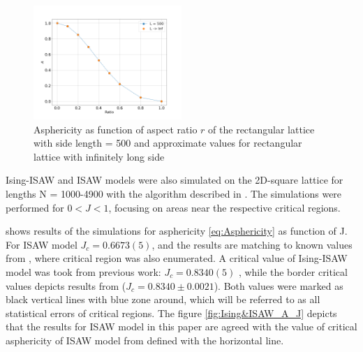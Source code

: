 \begin{figure}[h]
    \centering
    \includegraphics[width=0.5\textwidth]{Images/A_r.png}
    \caption{Asphericity as function of aspect ratio $r$ of the rectangular lattice with side length = 500 and approximate values for rectangular lattice with infinitely long side}
    \label{fig:A_r}
\end{figure}


Ising-ISAW and ISAW models were also simulated on the 2D-square lattice for lengths N = 1000-4900 with the algorithm described in \cite{faizullina2021critical}. 
The simulations were performed for $0 < J < 1$, focusing on areas near the respective critical regions.

 shows results of the simulations for asphericity \eqref{eq:Asphericity} as function of J. 
For ISAW model $J_{c} = 0.6673(5)$, and the results are matching to known values from \cite{Caracciolo2011}, where critical region was also enumerated.
A critical value of Ising-ISAW model was took from previous work: $J_{c} = 0.8340(5)$ \cite{faizullina2021critical}, while the border critical values depicts results from \cite{Foster2021} ($J_{c} = 0.8340 \pm 0.0021$). 
Both values were marked as black vertical lines with blue zone around, which will be referred to as all statistical errors of critical regions. 
The figure \ref{fig:Ising&ISAW_A_J} depicts that the results for ISAW model in this paper are agreed with the value of critical asphericity of ISAW model from \cite{Caracciolo2011} defined with the horizontal line.

